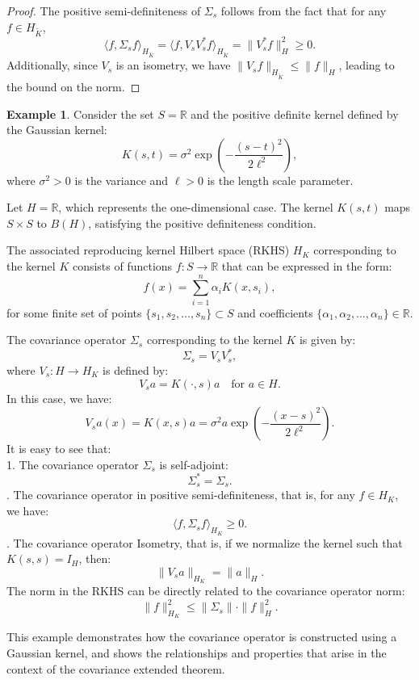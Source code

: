 \documentclass[11pt]{amsart}
\theoremstyle{definition}
\newtheorem{example}[theorem]{Example}
\numberwithin{equation}{section}
\begin{document}
\begin{proof}
The positive semi-definiteness of $\Sigma_s$ follows from the fact that for any $f \in H_{\tilde{K}}$,
\[
\langle f, \Sigma_s f \rangle_{H_{\tilde{K}}} = \langle f, V_s V_s^* f \rangle_{H_{\tilde{K}}} = \| V_s^* f \|_H^2 \geq 0.
\]
Additionally, since $V_s$ is an isometry, we have $\| V_s f \|_{H_{\tilde{K}}} \leq \| f \|_H$, leading to the bound on the norm.
\end{proof}
\begin{example}
Consider the set $S = \mathbb{R}$ and the positive definite kernel defined by the Gaussian kernel:
\[
K(s,t) = \sigma^2 \exp\left(-\frac{(s-t)^2}{2\ell^2}\right),
\]
where $\sigma^2 > 0$ is the variance and $\ell > 0$ is the length scale parameter. 

Let $H = \mathbb{R}$, which represents the one-dimensional case. The kernel $K(s,t)$ maps $S \times S$ to $B(H)$, satisfying the positive definiteness condition. 

The associated reproducing kernel Hilbert space (RKHS) $H_{K}$ corresponding to the kernel $K$ consists of functions $f: S \to \mathbb{R}$ that can be expressed in the form:
\[
f(x) = \sum_{i=1}^n \alpha_i K(x, s_i),
\]
for some finite set of points $\{s_1, s_2, \ldots, s_n\} \subset S$ and coefficients $\{\alpha_1, \alpha_2, \ldots, \alpha_n\} \in \mathbb{R}$.

The covariance operator $\Sigma_s$ corresponding to the kernel $K$ is given by:
\[
\Sigma_s = V_s V_s^*,
\]
where $V_s: H \to H_{K}$ is defined by:
\[
V_s a = K(\cdot, s) a \quad \text{for } a \in H.
\]
In this case, we have:
\[
V_s a(x) = K(x, s) a = \sigma^2 a \exp\left(-\frac{(x-s)^2}{2\ell^2}\right).
\]
\noindent
It is easy to see that:\\
1. The covariance operator $\Sigma_s$ is self-adjoint:
\[
\Sigma_s^* = \Sigma_s.
\]
. The covariance operator in positive semi-definiteness, that is, for any $f \in H_{K}$, we have:
\[
\langle f, \Sigma_s f \rangle_{H_{K}} \geq 0.
\]
. The covariance operator Isometry, that is, if we normalize the kernel such that $K(s,s) = I_H$, then:
\[
\|V_s a\|_{H_{K}} = \|a\|_H.
\]
\noindent
The norm in the RKHS can be directly related to the covariance operator norm:
\[
\|f\|_{H_{K}}^2 \leq \|\Sigma_s\| \cdot \|f\|_H^2.
\]
\end{example}
This example demonstrates how the covariance operator is constructed using a Gaussian kernel, and shows the relationships and properties that arise in the context of the covariance extended theorem.
\end{document}
